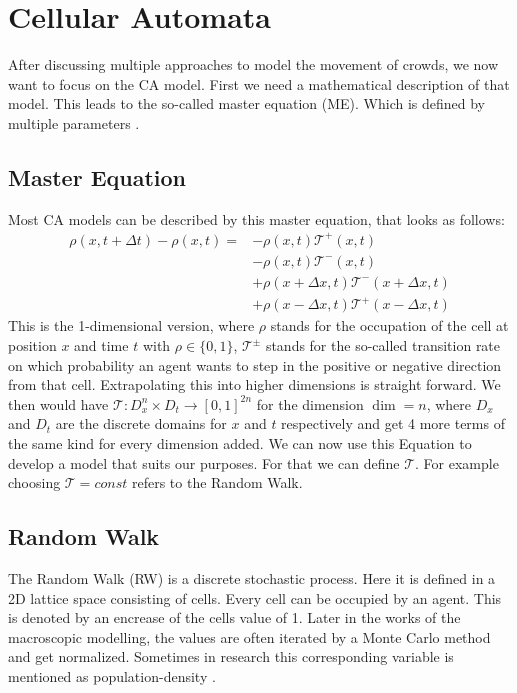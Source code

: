 \newpage
\section{Cellular Automata}
After discussing multiple approaches to model the movement of crowds, we now want to focus on the CA model. 
First we need a mathematical description of that model. This leads to the so-called master equation (ME). 
Which is defined by multiple parameters \cite{Michi}.

\subsection{Master Equation}
Most CA models can be described by this master equation, that looks as follows: 
\begin{equation}
   \label{eq:eq1}
   \begin{split}
   \rho(x,t+\Delta t) - \rho(x,t)  = & - \rho(x,t)\mathcal{T}^{+}(x,t) 
   \\ & - \rho(x,t)\mathcal{T}^{-}(x,t) 
   \\ & + \rho(x +\Delta x,t)\mathcal{T}^{-}(x + \Delta x,t)
   \\ & + \rho(x -\Delta x,t)\mathcal{T}^{+}(x - \Delta x,t) 
   \end{split}
\end{equation}
This is the 1-dimensional version, where $\rho$ stands for the occupation of the cell at position $ x $ and time $ t $ with $\rho \in \{0,1\} $, 
$ \mathcal{T}^{\pm}$ stands for the so-called transition rate on which probability an agent wants to step in the positive or negative direction from that cell.
Extrapolating this into higher dimensions is straight forward. We then would have $ \mathcal{T}: D_x^{n}\times D_t \to [0,1]^{2n} $ for the dimension $\dim = n$, 
where $D_x$ and $D_t$ are the discrete domains for $x$ and $t$ respectively and get 4 more terms of the same kind for every dimension added. 
We can now use this Equation to develop a model that suits our purposes. 
For that we can define $ \mathcal{T} $. For example choosing $ \mathcal{T} = const$ refers to the Random Walk. 


\subsection{Random Walk}
The Random Walk (RW) is a discrete stochastic process. Here it is defined in a 2D lattice space consisting of cells. Every cell can be occupied by an agent. 
This is denoted by an encrease of the cells value of 1. 
Later in the works of the macroscopic modelling, the values are often iterated by a Monte Carlo method and get normalized. 
Sometimes in research this corresponding variable is mentioned as population-density \cite{Michi}.

